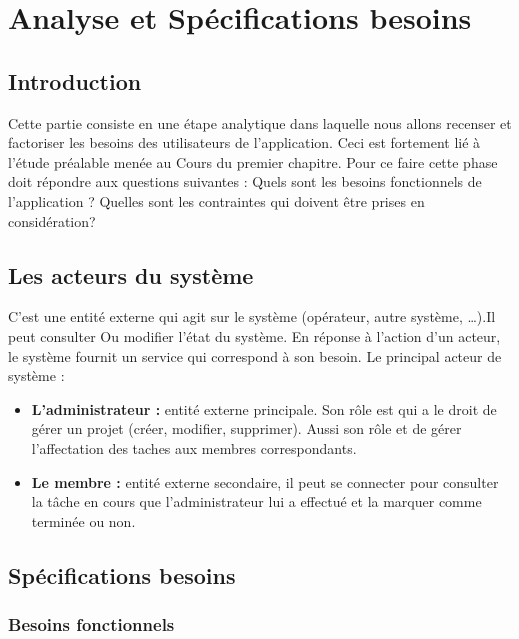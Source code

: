 \chapter{ Analyse et Sp\'{e}cifications besoins }
\section{Introduction}


Cette partie consiste en une \'{e}tape analytique dans laquelle nous allons
recenser et factoriser les besoins des utilisateurs de l'application. Ceci est
fortement li\'{e} \`{a} l'\'{e}tude pr\'{e}alable men\'{e}e au
Cours du premier chapitre.
Pour ce faire cette phase doit r\'{e}pondre aux questions suivantes :
Quels sont les besoins fonctionnels de l'application ?
Quelles sont les contraintes qui doivent \^{e}tre prises en consid\'{e}ration?

   \section{ Les acteurs du syst\`{e}me }
C'est une entit\'{e} externe qui agit sur le syst\`{e}me (op\'{e}rateur, autre syst\`{e}me,
\ldots{}).Il peut consulter
Ou modifier l'\'{e}tat du syst\`{e}me.
En r\'{e}ponse \`{a} l'action d'un acteur, le syst\`{e}me fournit un service qui
correspond \`{a} son besoin.
Le principal acteur de syst\`{e}me :
\begin{itemize}
\item{  \textbf{L'administrateur :} entit\'{e} externe principale. Son r\^{o}le est qui a le droit de
g\'{e}rer un projet (cr\'{e}er, modifier, supprimer).
Aussi son r\^{o}le et de g\'{e}rer l'affectation des taches aux membres
correspondants.
}

\item{ \textbf{Le membre : } entit\'{e} externe secondaire, il peut se connecter pour consulter la
t\^{a}che en cours que l'administrateur lui a effectu\'{e} et la marquer comme
termin\'{e}e ou non.
}
\end{itemize}


\section{ Sp\'{e}cifications besoins}

  \subsection{Besoins fonctionnels}

